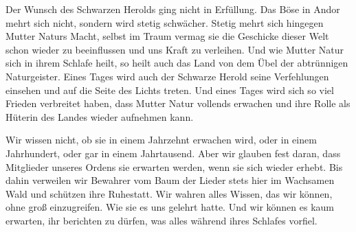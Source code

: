 Der Wunsch des Schwarzen Herolds ging nicht in Erfüllung. Das Böse in Andor mehrt sich nicht, sondern wird stetig schwächer. Stetig mehrt sich hingegen Mutter Naturs Macht, selbst im Traum vermag sie die Geschicke dieser Welt schon wieder zu beeinflussen und uns Kraft zu verleihen. Und wie Mutter Natur sich in ihrem Schlafe heilt, so heilt auch das Land von dem Übel der abtrünnigen Naturgeister. Eines Tages wird auch der Schwarze Herold seine Verfehlungen einsehen und auf die Seite des Lichts treten. Und eines Tages wird sich so viel Frieden verbreitet haben, dass Mutter Natur vollends erwachen und ihre Rolle als Hüterin des Landes wieder aufnehmen kann.

Wir wissen nicht, ob sie in einem Jahrzehnt erwachen wird, oder in einem Jahrhundert, oder gar in einem Jahrtausend. Aber wir glauben fest daran, dass Mitglieder unseres Ordens sie erwarten werden, wenn sie sich wieder erhebt. Bis dahin verweilen wir Bewahrer vom Baum der Lieder stets hier im Wachsamen Wald und schützen ihre Ruhestatt. Wir wahren alles Wissen, das wir können, ohne groß einzugreifen. Wie sie es uns gelehrt hatte. Und wir können es kaum erwarten, ihr berichten zu dürfen, was alles während ihres Schlafes vorfiel.
